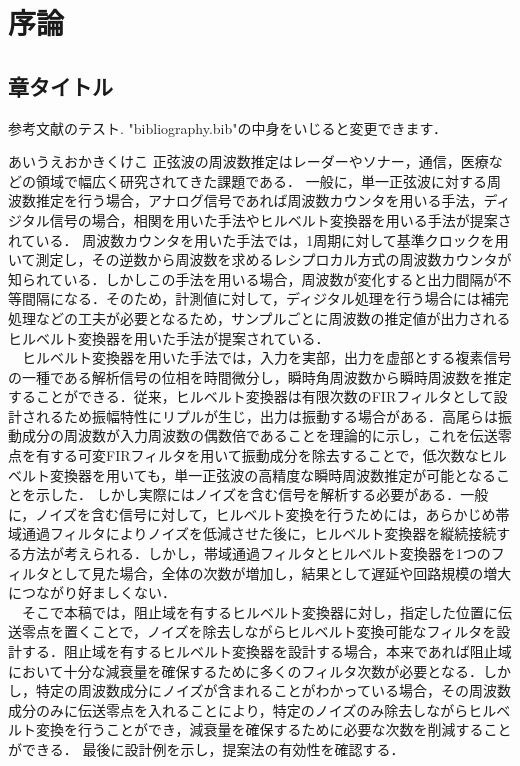 \chapter{序論}

\section{章タイトル}
参考文献のテスト\cite{樋口龍雄2000}.
"bibliography.bib"の中身をいじると変更できます．

あいうえおかきくけこ
正弦波の周波数推定はレーダーやソナー，通信，医療などの領域で幅広く研究されてきた課題である\cite{R.G.McKilliam,K.Wang,D.Rife}．
一般に，単一正弦波に対する周波数推定を行う場合，アナログ信号であれば周波数カウンタを用いる手法，ディジタル信号の場合，相関を用いた手法やヒルベルト変換器を用いる手法が提案されている．
周波数カウンタを用いた手法では，1周期に対して基準クロックを用いて測定し，その逆数から周波数を求めるレシプロカル方式の周波数カウンタが知られている．しかしこの手法を用いる場合，周波数が変化すると出力間隔が不等間隔になる．そのため，計測値に対して，ディジタル処理を行う場合には補完処理などの工夫が必要となるため，サンプルごとに周波数の推定値が出力されるヒルベルト変換器を用いた手法が提案されている．\\
　ヒルベルト変換器を用いた手法では，入力を実部，出力を虚部とする複素信号の一種である解析信号の位相を時間微分し，瞬時角周波数から瞬時周波数を推定することができる．従来，ヒルベルト変換器は有限次数のFIRフィルタとして設計されるため振幅特性にリプルが生じ，出力は振動する場合がある．高尾ら\cite{高尾可変なし,高尾可変あり}は振動成分の周波数が入力周波数の偶数倍であることを理論的に示し，これを伝送零点を有する可変FIRフィルタを用いて振動成分を除去することで，低次数なヒルベルト変換器を用いても，単一正弦波の高精度な瞬時周波数推定が可能となることを示した．
しかし実際にはノイズを含む信号を解析する必要がある．一般に，ノイズを含む信号に対して，ヒルベルト変換を行うためには，あらかじめ帯域通過フィルタによりノイズを低減させた後に，ヒルベルト変換器を縦続接続する方法が考えられる．しかし，帯域通過フィルタとヒルベルト変換器を1つのフィルタとして見た場合，全体の次数が増加し，結果として遅延や回路規模の増大につながり好ましくない．\\
　そこで本稿では，阻止域を有するヒルベルト変換器に対し，指定した位置に伝送零点を置くことで，ノイズを除去しながらヒルベルト変換可能なフィルタを設計する．阻止域を有するヒルベルト変換器を設計する場合，本来であれば阻止域において十分な減衰量を確保するために多くのフィルタ次数が必要となる．しかし，特定の周波数成分にノイズが含まれることがわかっている場合，その周波数成分のみに伝送零点を入れることにより，特定のノイズのみ除去しながらヒルベルト変換を行うことができ，減衰量を確保するために必要な次数を削減することができる．
最後に設計例を示し，提案法の有効性を確認する．
